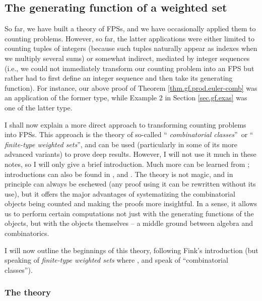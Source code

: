 \subsection{\label{sec.gf.weighted-set}The generating function of a weighted
set}

So far, we have built a theory of FPSs, and we have occasionally applied them
to counting problems. However, so far, the latter applications were either
limited to counting tuples of integers (because such tuples naturally appear
as indexes when we multiply several sums) or somewhat indirect, mediated by
integer sequences (i.e., we could not immediately transform our counting
problem into an FPS but rather had to first define an integer sequence and
then take its generating function). For instance, our above proof of Theorem
\ref{thm.gf.prod.euler-comb} was an application of the former type, while
Example 2 in Section \ref{sec.gf.exas} was one of the latter type.

I shall now explain a more direct approach to transforming counting problems
into FPSs. This approach is the theory of so-called \textquotedblleft%
\emph{combinatorial classes}\textquotedblright\ or \textquotedblleft%
\emph{finite-type weighted sets}\textquotedblright, and can be used
(particularly in some of its more advanced variants) to prove deep results.
However, I will not use it much in these notes, so I will only give a brief
introduction. Much more can be learned from \cite[Part A]{FlaSed09};
introductions can also be found in \cite[\S 3.3--\S 3.4]{Fink17}, \cite[Parts
1 and 2]{Melcze24} and \cite[Chapter 6]{Loehr-BC}. The theory is not magic,
and in principle can always be eschewed (any proof using it can be rewritten
without its use), but it offers the major advantages of systematizing the
combinatorial objects being counted and making the proofs more insightful. In
a sense, it allows us to perform certain computations not just with the
generating functions of the objects, but with the objects themselves -- a
middle ground between algebra and combinatorics.

I will now outline the beginnings of this theory, following Fink's
introduction \cite[\S 3.3--\S 3.4]{Fink17} (but speaking of \emph{finite-type
weighted sets} where \cite{Fink17}, \cite{Melcze24} and \cite{FlaSed09} speak
of \textquotedblleft combinatorial classes\textquotedblright).

\subsubsection{The theory}

